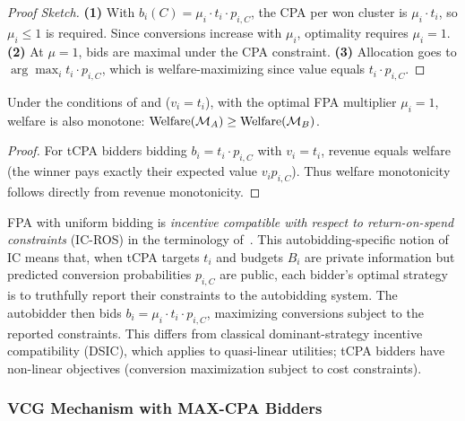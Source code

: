 \begin{proof}[Proof Sketch]
\textbf{(1)} With $b_i(C) = \mu_i \cdot t_i \cdot p_{i,C}$, the CPA per won cluster is $\mu_i \cdot t_i$, so $\mu_i \leq 1$ is required. Since conversions increase with $\mu_i$, optimality requires $\mu_i = 1$. \textbf{(2)} At $\mu = 1$, bids are maximal under the CPA constraint. \textbf{(3)} Allocation goes to $\arg\max_i t_i \cdot p_{i,C}$, which is welfare-maximizing since value equals $t_i \cdot p_{i,C}$.
\end{proof}

\begin{corollary}
\label{cor:fpa-welfare-tcpa}
Under the conditions of  and  ($v_i=t_i$), with the optimal FPA multiplier $\mu_i=1$, welfare is also monotone: $\text{Welfare}(\mathcal{M}_A) \geq \text{Welfare}(\mathcal{M}_B)$.
\end{corollary}

\begin{proof}
For tCPA bidders bidding $b_i = t_i \cdot p_{i,C}$ with $v_i=t_i$, revenue equals welfare (the winner pays exactly their expected value $v_i p_{i,C}$). Thus welfare monotonicity follows directly from revenue monotonicity.
\end{proof}

\begin{remark}
\label{rem:fpa-ic}
FPA with uniform bidding is \emph{incentive compatible with respect to return-on-spend constraints} (IC-ROS) in the terminology of~\citet{aggarwal2024autobidding}. This autobidding-specific notion of IC means that, when tCPA targets $t_i$ and budgets $B_i$ are private information but predicted conversion probabilities $p_{i,C}$ are public, each bidder's optimal strategy is to truthfully report their constraints to the autobidding system. The autobidder then bids $b_i = \mu_i \cdot t_i \cdot p_{i,C}$, maximizing conversions subject to the reported constraints. This differs from classical dominant-strategy incentive compatibility (DSIC), which applies to quasi-linear utilities; tCPA bidders have non-linear objectives (conversion maximization subject to cost constraints).
\end{remark}

\subsubsection{VCG Mechanism with MAX-CPA Bidders}


